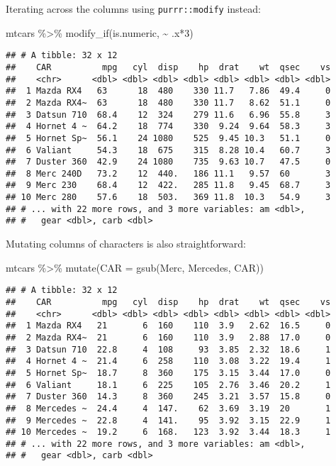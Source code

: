 \documentclass[
]{book}
\newenvironment{Shaded}{\begin{snugshade}}{\end{snugshade}}
\newcommand{\AttributeTok}[1]{\textcolor[rgb]{0.77,0.63,0.00}{#1}}
\newcommand{\DecValTok}[1]{\textcolor[rgb]{0.00,0.00,0.81}{#1}}
\newcommand{\FunctionTok}[1]{\textcolor[rgb]{0.00,0.00,0.00}{#1}}
\newcommand{\NormalTok}[1]{#1}
\newcommand{\SpecialCharTok}[1]{\textcolor[rgb]{0.00,0.00,0.00}{#1}}
\newcommand{\StringTok}[1]{\textcolor[rgb]{0.31,0.60,0.02}{#1}}
\begin{document}
Iterating across the columns using \texttt{purrr::modify} instead:

\begin{Shaded}
\begin{Highlighting}[]
\NormalTok{mtcars }\SpecialCharTok{\%\textgreater{}\%} \FunctionTok{modify\_if}\NormalTok{(is.numeric, }\SpecialCharTok{\textasciitilde{}}\NormalTok{ .x}\SpecialCharTok{*}\DecValTok{3}\NormalTok{)}
\end{Highlighting}
\end{Shaded}

\begin{verbatim}
## # A tibble: 32 x 12
##    CAR          mpg   cyl  disp    hp  drat    wt  qsec    vs
##    <chr>      <dbl> <dbl> <dbl> <dbl> <dbl> <dbl> <dbl> <dbl>
##  1 Mazda RX4   63      18  480    330 11.7   7.86  49.4     0
##  2 Mazda RX4~  63      18  480    330 11.7   8.62  51.1     0
##  3 Datsun 710  68.4    12  324    279 11.6   6.96  55.8     3
##  4 Hornet 4 ~  64.2    18  774    330  9.24  9.64  58.3     3
##  5 Hornet Sp~  56.1    24 1080    525  9.45 10.3   51.1     0
##  6 Valiant     54.3    18  675    315  8.28 10.4   60.7     3
##  7 Duster 360  42.9    24 1080    735  9.63 10.7   47.5     0
##  8 Merc 240D   73.2    12  440.   186 11.1   9.57  60       3
##  9 Merc 230    68.4    12  422.   285 11.8   9.45  68.7     3
## 10 Merc 280    57.6    18  503.   369 11.8  10.3   54.9     3
## # ... with 22 more rows, and 3 more variables: am <dbl>,
## #   gear <dbl>, carb <dbl>
\end{verbatim}

Mutating columns of characters is also straightforward:

\begin{Shaded}
\begin{Highlighting}[]
\NormalTok{mtcars }\SpecialCharTok{\%\textgreater{}\%} \FunctionTok{mutate}\NormalTok{(}\AttributeTok{CAR =} \FunctionTok{gsub}\NormalTok{(}\StringTok{\textquotesingle{}Merc\textquotesingle{}}\NormalTok{, }\StringTok{\textquotesingle{}Mercedes\textquotesingle{}}\NormalTok{, CAR))}
\end{Highlighting}
\end{Shaded}

\begin{verbatim}
## # A tibble: 32 x 12
##    CAR          mpg   cyl  disp    hp  drat    wt  qsec    vs
##    <chr>      <dbl> <dbl> <dbl> <dbl> <dbl> <dbl> <dbl> <dbl>
##  1 Mazda RX4   21       6  160    110  3.9   2.62  16.5     0
##  2 Mazda RX4~  21       6  160    110  3.9   2.88  17.0     0
##  3 Datsun 710  22.8     4  108     93  3.85  2.32  18.6     1
##  4 Hornet 4 ~  21.4     6  258    110  3.08  3.22  19.4     1
##  5 Hornet Sp~  18.7     8  360    175  3.15  3.44  17.0     0
##  6 Valiant     18.1     6  225    105  2.76  3.46  20.2     1
##  7 Duster 360  14.3     8  360    245  3.21  3.57  15.8     0
##  8 Mercedes ~  24.4     4  147.    62  3.69  3.19  20       1
##  9 Mercedes ~  22.8     4  141.    95  3.92  3.15  22.9     1
## 10 Mercedes ~  19.2     6  168.   123  3.92  3.44  18.3     1
## # ... with 22 more rows, and 3 more variables: am <dbl>,
## #   gear <dbl>, carb <dbl>
\end{verbatim}
\end{document}
